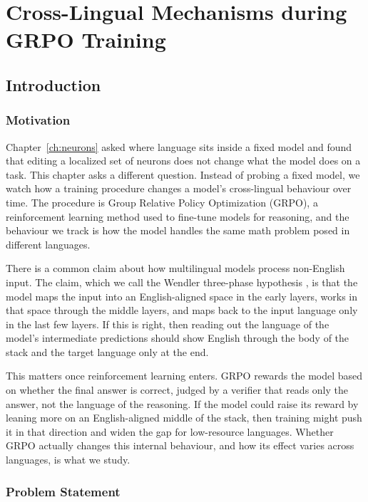 \chapter{Cross-Lingual Mechanisms during GRPO Training}
\label{ch:grpo-crosslingual}

\section{Introduction}
\label{sec:grpo-intro}

\subsection{Motivation}
\label{subsec:grpo-motivation}

Chapter~\ref{ch:neurons} asked where language sits inside a fixed model and found
that editing a localized set of neurons does not change what the model does on a
task. This chapter asks a different question. Instead of probing a fixed model, we
watch how a training procedure changes a model's cross-lingual behaviour over time.
The procedure is Group Relative Policy Optimization (GRPO), a reinforcement learning
method used to fine-tune models for reasoning, and the behaviour we track is how the
model handles the same math problem posed in different languages.

There is a common claim about how multilingual models process non-English input.
The claim, which we call the Wendler three-phase hypothesis
\citep{wendler2024llamas}, is that the model maps the input into an English-aligned
space in the early layers, works in that space through the middle layers, and maps
back to the input language only in the last few layers. If this is right, then
reading out the language of the model's intermediate predictions should show English
through the body of the stack and the target language only at the end.

This matters once reinforcement learning enters. GRPO rewards the model based on
whether the final answer is correct, judged by a verifier that reads only the
answer, not the language of the reasoning. If the model could raise its reward by
leaning more on an English-aligned middle of the stack, then training might push it
in that direction and widen the gap for low-resource languages. Whether GRPO
actually changes this internal behaviour, and how its effect varies across
languages, is what we study.

\subsection{Problem Statement}
\label{subsec:grpo-problem}

